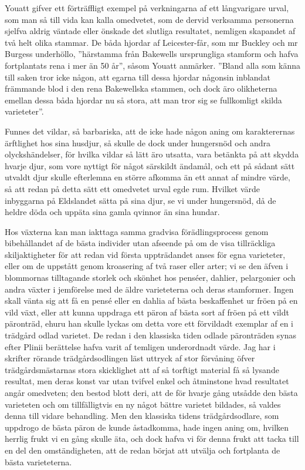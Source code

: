 Youatt gifver ett förträffligt exempel på verkningarna af ett långvarigare urval, som man så till vida kan kalla omedvetet, som de dervid verksamma personerna sjelfva aldrig väntade eller önskade det slutliga resultatet, nemligen skapandet af två helt olika stammar. De båda hjordar af Leicester-får, som mr Buckley och mr Burgess underhöllo, ”härstamma från Bakewells ursprungliga stamform och hafva fortplantats rena i mer än 50 år”, såsom Youatt anmärker. ”Bland alla som känna till saken tror icke någon, att egarna till dessa hjordar någonsin inblandat främmande blod i den rena Bakewellska stammen, och dock äro olikheterna emellan dessa båda hjordar nu så stora, att man tror sig se fullkomligt skilda varieteter”.

Funnes det vildar, så barbariska, att de icke hade någon aning om karakterernas ärftlighet hos sina husdjur, så skulle de dock under hungersnöd och andra olyckshändelser, för hvilka vildar så lätt äro utsatta, vara betänkta på att skydda hvarje djur, som vore nyttigt för något särskildt ändamål, och ett på sådant sätt utvaldt djur skulle efterlemna en större afkomma än ett annat af mindre värde, så att redan på detta sätt ett omedvetet urval egde rum. Hvilket värde inbyggarna på Eldslandet sätta på sina djur, se vi under hungersnöd, då de heldre döda och uppäta sina gamla qvinnor än sina hundar.

Hos växterna kan man iakttaga samma gradvisa förädlingsprocess genom bibehållandet af de bästa individer utan afseende på om de visa tillräckliga skiljaktigheter för att redan vid första uppträdandet anses för egna varieteter, eller om de uppstått genom kroasering af två raser eller arter; vi se den äfven i blommornas tilltagande storlek och skönhet hos penséer, dahlier, pelargonier och andra växter i jemförelse med de äldre varieteterna och deras stamformer. Ingen skall vänta sig att få en pensé eller en dahlia af bästa beskaffenhet ur fröen på en vild växt, eller att kunna uppdraga ett päron af bästa sort af fröen på ett vildt päronträd, ehuru han skulle lyckas om detta vore ett förvildadt exemplar af en i trädgård odlad varietet. De redan i den klassiska tiden odlade päronträden synas efter Plinii berättelse hafva varit af temligen underordnadt värde. Jag har i skrifter rörande trädgårdsodlingen läst uttryck af stor förvåning öfver trädgårdsmästarnas stora skicklighet att af så torftigt material få så lysande resultat, men deras konst var utan tvifvel enkel och åtminstone hvad resultatet angår omedveten; den bestod blott deri, att de för hvarje gång utsådde den bästa varieteten och om tillfälligtvis en ny något bättre varietet bildades, så valdes denna till vidare behandling. Men den klassiska tidens trädgårdsodlare, som uppdrogo de bästa päron de kunde åstadkomma, hade ingen aning om, hvilken herrlig frukt vi en gång skulle äta, och dock hafva vi för denna frukt att tacka till en del den omständigheten, att de redan börjat att utvälja och fortplanta de bästa varieteterna.


